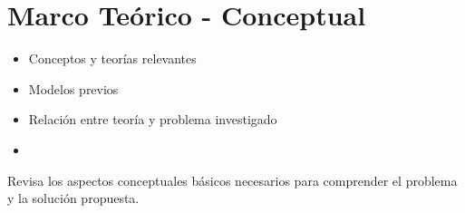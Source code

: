\chapter{Marco Teórico - Conceptual} 
\begin{itemize}
    \item Conceptos y teorías relevantes
    \item Modelos previos
    \item Relación entre teoría y problema investigado
    \item 
\end{itemize}

Revisa los aspectos conceptuales básicos necesarios para comprender el problema y la solución propuesta.
